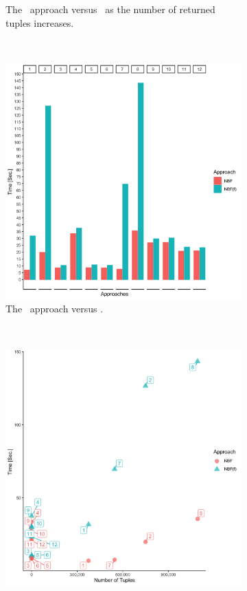 \begin{figure}[t!]
\begin{subfigure}[t]{0.5\textwidth}
        \caption[The \nbfi\ approach versus \nbfif\ as the number of returned tuples increases]{The \nbfi\ approach versus \nbfif\ as the number of returned tuples increases.}
        \label{fig:emp-nbfi-tuple}
    \end{subfigure}\\[1ex]
    \begin{subfigure}[t]{0.5\textwidth}
        \centering
        \includegraphics[scale=0.09]{figs/plots/emp-nbf-comp-f.png}
        \caption[The \nbf\ approach versus \nbff]{The \nbf\ approach versus \nbff.}
    \end{subfigure}%
    ~ 
    \begin{subfigure}[t]{0.5\textwidth}
        \centering
        \includegraphics[scale=0.09]{figs/plots/emp-nbf-f-comp-scatter.png}

\end{subfigure}
\end{figure}
